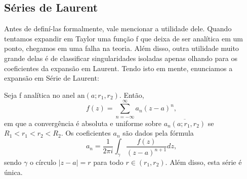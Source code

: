 \documentclass[ComplexAnalysis/complex.tex]{subfiles}
\begin{document}
\subsection{Séries de Laurent}
Antes de definí-las formalmente, vale mencionar a utilidade dele. Quando tentamos expandir em Taylor uma função f que
deixa de ser analítica em um ponto, chegamos em uma falha na teoria. Além disso, outra utilidade muito grande delas é de classificar singularidades
isoladas apenas olhando para os coeficientes da expansão em Laurent. Tendo isto em mente, enunciamos a expansão em Série de Laurent:
\hypertarget{laurent}{
	\begin{theorem*}
		Seja f analítica no anel \(\mathrm{an}(a; r_{1}, r_{2})\). Então,
		\[
			f(z) = \sum\limits_{n=-\infty}^{\infty}a_{n}(z-a)^{n},
		\]
		em que a convergência é absoluta e uniforme sobre \(\overline{a_{n}(a; r_{1}, r_{2})}\) se
		\(R_{1} < r_{1} < r_{2} < R_{2}.\) Os coeficientes \(a_{n}\) são dados pela fórmula
		\[
			a_{n} = \frac{1}{2\pi i}\int_{\gamma }^{}\frac{f(z)}{(z-a)^{n+1}}dz,
		\]
		sendo \(\gamma \) o círculo \(|z-a|=r\) para todo \(r\in (r_{1}, r_{2}).\) Além disso, esta série é única.
	\end{theorem*}}
\end{document}
